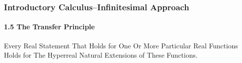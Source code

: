 \begin{frame}
\frametitle{Introductory Calculus--Infinitesimal Approach}
\framesubtitle{1.5 The Transfer Principle}
\label{slide:1.5-09}
\begin{definition}
Every \alert{Real Statement} That Holds for One Or More Particular Real Functions Holds for The Hyperreal Natural Extensions of These Functions.
\label{def:transfer-principle}
\end{definition}
\end{frame}
